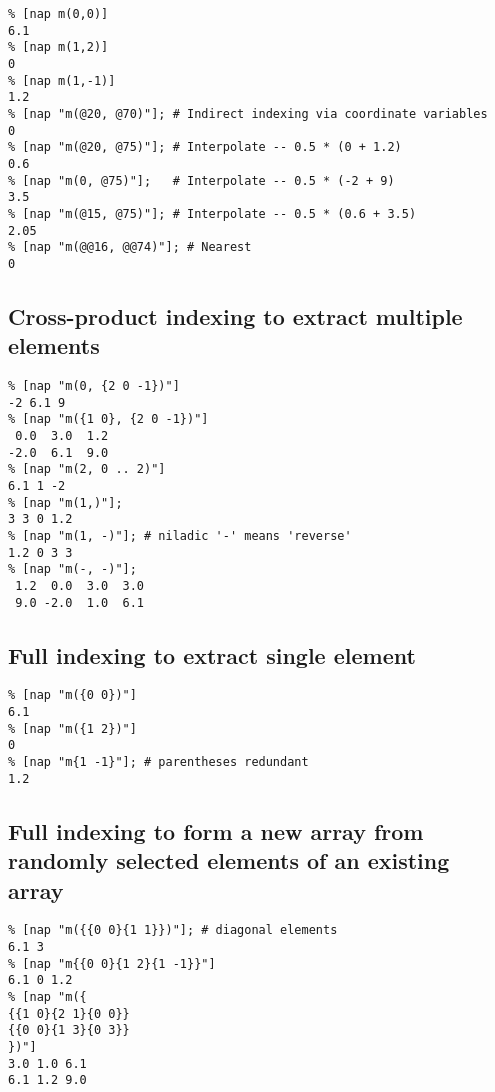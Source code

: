     \begin{verbatim}
% [nap m(0,0)]
6.1
% [nap m(1,2)]
0
% [nap m(1,-1)]
1.2
% [nap "m(@20, @70)"]; # Indirect indexing via coordinate variables
0
% [nap "m(@20, @75)"]; # Interpolate -- 0.5 * (0 + 1.2)
0.6
% [nap "m(0, @75)"];   # Interpolate -- 0.5 * (-2 + 9)
3.5
% [nap "m(@15, @75)"]; # Interpolate -- 0.5 * (0.6 + 3.5)
2.05
% [nap "m(@@16, @@74)"]; # Nearest
0
\end{verbatim}

\subsection{Cross-product indexing to extract multiple elements}

    \begin{verbatim}
% [nap "m(0, {2 0 -1})"]
-2 6.1 9
% [nap "m({1 0}, {2 0 -1})"]
 0.0  3.0  1.2
-2.0  6.1  9.0
% [nap "m(2, 0 .. 2)"]
6.1 1 -2
% [nap "m(1,)"];
3 3 0 1.2
% [nap "m(1, -)"]; # niladic '-' means 'reverse'
1.2 0 3 3
% [nap "m(-, -)"];
 1.2  0.0  3.0  3.0
 9.0 -2.0  1.0  6.1
\end{verbatim}

\subsection{Full indexing to extract single element}

    \begin{verbatim}
% [nap "m({0 0})"]
6.1
% [nap "m({1 2})"]
0
% [nap "m{1 -1}"]; # parentheses redundant
1.2
\end{verbatim}

\subsection{Full indexing to form a new array from randomly selected elements of an existing array}

    \begin{verbatim}
% [nap "m({{0 0}{1 1}})"]; # diagonal elements
6.1 3
% [nap "m{{0 0}{1 2}{1 -1}}"]
6.1 0 1.2
% [nap "m({
{{1 0}{2 1}{0 0}}
{{0 0}{1 3}{0 3}}
})"]
3.0 1.0 6.1
6.1 1.2 9.0
\end{verbatim}

